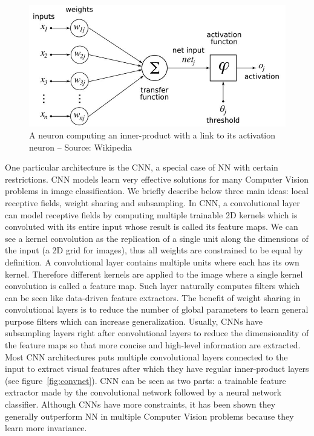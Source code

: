 \documentclass[a4paper,12pt]{report}
\begin{document}
\begin{figure}[t]
    \begin{center}
        \includegraphics{thesis_figures/800px-ArtificialNeuronModel_english.jpg}
    \end{center}
    \caption{A neuron computing an inner-product with a link to its activation neuron -- Source: Wikipedia}
    \label{fig:artificial_neurons}
\end{figure}

One particular architecture is the CNN, a special case of NN with certain restrictions.
CNN models learn very effective solutions for many Computer Vision problems in image classification.
We briefly describe below three main ideas: local receptive fields, weight sharing and subsampling.
In CNN, a convolutional layer can model receptive fields by computing multiple trainable 2D kernels which is convoluted with its entire input whose result is called its feature maps.
We can see a kernel convolution as the replication of a single unit along the dimensions of the input (a 2D grid for images), thus all weights are constrained to be equal by definition.
A convolutional layer contains multiple units where each has its own kernel.
Therefore different kernels are applied to the image where a single kernel convolution is called a feature map.
Such layer naturally computes filters which can be seen like data-driven feature extractors.
The benefit of weight sharing in convolutional layers is to reduce the number of global parameters to learn general purpose filters which can increase generalization.
Usually, CNNs have subsampling layers right after convolutional layers to reduce the dimensionality of the feature maps so that more concise and high-level information are extracted.
Most CNN architectures puts multiple convolutional layers connected to the input to extract visual features after which they have regular inner-product layers (see figure~\ref{fig:convnet}).
CNN can be seen as two parts: a trainable feature extractor made by the convolutional network followed by a neural network classifier.
Although CNNs have more constraints, it has been shown they generally outperform NN in multiple Computer Vision problems because they learn more invariance\cite{simard2003best}\cite{mnist_web}\cite{lawrence1997face}\cite{krizhevsky2012imagenet}.
\end{document}

